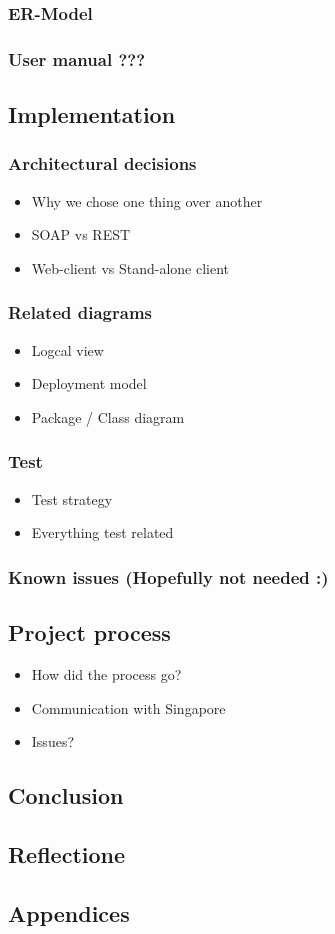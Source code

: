 \documentclass[11pt]{article}
\begin{document}
\subsubsection{ER-Model}

\subsubsection{User manual ???}

\subsection{Implementation}

\subsubsection{Architectural decisions}


\begin{itemize}
\item Why we chose one thing over another
\item SOAP vs REST
\item Web-client vs Stand-alone client
\end{itemize}
\subsubsection{Related diagrams}
\label{sec-1-4-2}

\begin{itemize}
\item Logcal view
\item Deployment model
\item Package / Class diagram
\end{itemize}
\subsubsection{Test}
\label{sec-1-4-3}

\begin{itemize}
\item Test strategy
\item Everything test related
\end{itemize}
\subsubsection{Known issues (Hopefully not needed :)}
\label{sec-1-4-4}
\subsection{Project process}
\label{sec-1-5}

\begin{itemize}
\item How did the process go?
\item Communication with Singapore
\item Issues?
\end{itemize}
\subsection{Conclusion}
\label{sec-1-6}
\subsection{Reflectione}
\label{sec-1-7}
\subsection{Appendices}
\label{sec-1-8}
\end{document}
